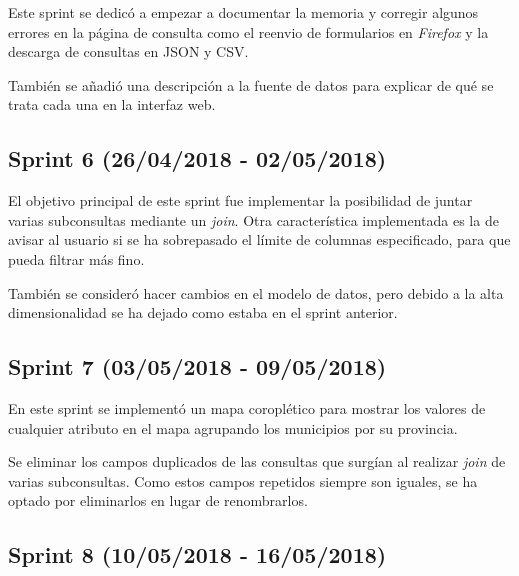 Este sprint se dedicó a empezar a documentar la memoria y corregir algunos errores en la página de consulta como el reenvio de formularios en \textit{Firefox} y la descarga de consultas en JSON y CSV.

También se añadió una descripción a la fuente de datos para explicar de qué se trata cada una en la interfaz web.



\subsection{Sprint 6 (26/04/2018 - 02/05/2018)}

El objetivo principal de este sprint fue implementar la posibilidad de juntar varias subconsultas mediante un \textit{join}. Otra característica implementada es la de avisar al usuario si se ha sobrepasado el límite de columnas especificado, para que pueda filtrar más fino.

También se consideró hacer cambios en el modelo de datos, pero debido a la alta dimensionalidad se ha dejado como estaba en el sprint anterior.



\subsection{Sprint 7 (03/05/2018 - 09/05/2018)}

En este sprint se implementó un mapa coroplético para mostrar los valores de cualquier atributo en el mapa agrupando los municipios por su provincia.

Se eliminar los campos duplicados de las consultas que surgían al realizar \textit{join} de varias subconsultas. Como estos campos repetidos siempre son iguales, se ha optado por eliminarlos en lugar de renombrarlos.



\subsection{Sprint 8 (10/05/2018 - 16/05/2018)}

